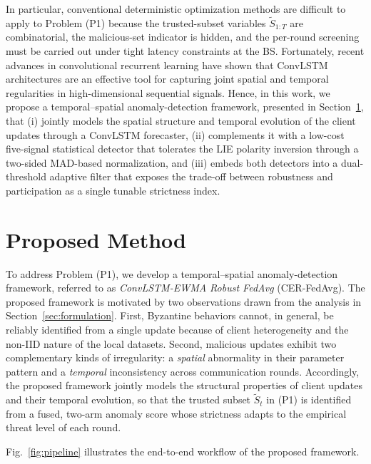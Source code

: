 \documentclass[journal]{IEEEtran}
\begin{document}
In particular, conventional deterministic optimization methods are difficult to apply to Problem (P1) because the trusted-subset variables $\widetilde{S}_{1:T}$ are combinatorial, the malicious-set indicator is hidden, and the per-round screening must be carried out under tight latency constraints at the BS. Fortunately, recent advances in convolutional recurrent learning have shown that ConvLSTM~\cite{shi2015convolutional} architectures are an effective tool for capturing joint spatial and temporal regularities in high-dimensional sequential signals. Hence, in this work, we propose a temporal–spatial anomaly-detection framework, presented in Section~\ref{sec:method}, that (i) jointly models the spatial structure and temporal evolution of the client updates through a ConvLSTM forecaster, (ii) complements it with a low-cost five-signal statistical detector that tolerates the LIE polarity inversion through a two-sided MAD-based normalization, and (iii) embeds both detectors into a dual-threshold adaptive filter that exposes the trade-off between robustness and participation as a single tunable strictness index.

\section{Proposed Method}
\label{sec:method}

To address Problem (P1), we develop a temporal–spatial anomaly-detection framework, referred to as \emph{ConvLSTM-EWMA Robust FedAvg} (CER-FedAvg). The proposed framework is motivated by two observations drawn from the analysis in Section~\ref{sec:formulation}. First, Byzantine behaviors cannot, in general, be reliably identified from a single update because of client heterogeneity and the non-IID nature of the local datasets. Second, malicious updates exhibit two complementary kinds of irregularity: a \emph{spatial} abnormality in their parameter pattern and a \emph{temporal} inconsistency across communication rounds. Accordingly, the proposed framework jointly models the structural properties of client updates and their temporal evolution, so that the trusted subset $\widetilde{S}_t$ in (P1) is identified from a fused, two-arm anomaly score whose strictness adapts to the empirical threat level of each round.

Fig.~\ref{fig:pipeline} illustrates the end-to-end workflow of the proposed framework.
\end{document}
